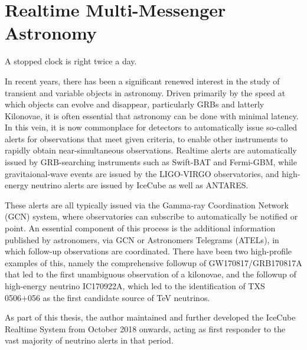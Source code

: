 \setchapterpreamble[u]{\margintoc}
\chapter{Realtime Multi-Messenger Astronomy}
\begin{fquote} A stopped clock is right twice a day.
\end{fquote}

In recent years, there has been a significant renewed interest in the study of transient and variable objects in astronomy. Driven primarily by the speed at which objects can evolve and disappear, particularly GRBs and latterly Kilonovae, it is often essential that astronomy can be done with minimal latency. In this vein, it is now commonplace for detectors to automatically issue so-called alerts for observations that meet given criteria, to enable other instruments to rapidly obtain near-simultaneous observations. Realtime alerts are automatically issued by GRB-searching instruments such as Swift-BAT and Fermi-GBM, while gravitaional-wave events are issued by the LIGO-VIRGO observatories, and high-energy neutrino alerts are issued by IceCube as well as ANTARES.

These alerts are all typically issued via  the Gamma-ray Coordination Network (GCN) system, where observatories can subscribe to automatically be notified or point.  An essential component of this process is the additional information published by astronomers, via GCN or Astronomers Telegrams (ATELs), in which follow-up observations are coordinated. There have been two high-profile examples of this, namely the comprehensive followup of GW170817/GRB170817A that led to the first unambiguous observation of a kilonovae, and the followup of high-energy neutrino IC170922A, which led to the identification of TXS 0506+056 as the first candidate source of TeV neutrinos. 

As part of this thesis, the author maintained and further developed the IceCube Realtime System from October 2018 onwards, acting as first responder to the vast majority of neutrino alerts in that period.

